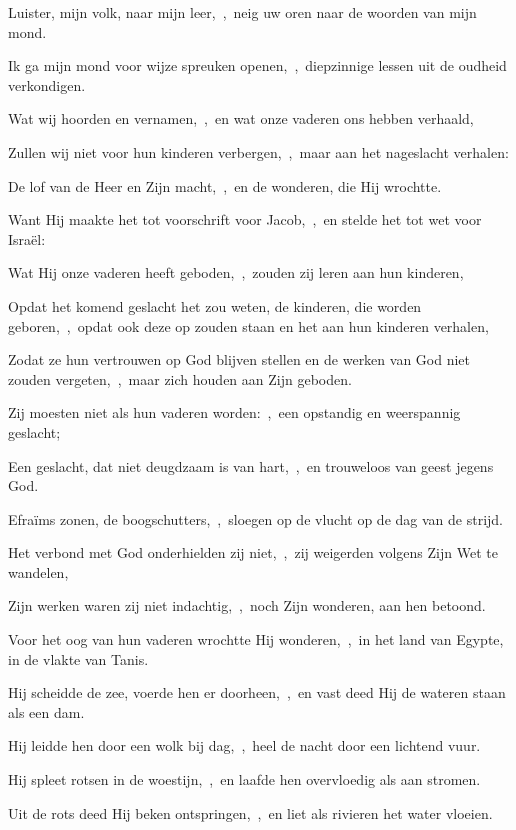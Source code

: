\documentclass[12pt,twoside,a5paper]{article}
\begin{document}



\begin{halfparskip}
  Luister, mijn volk, naar mijn leer,~\sep\ neig uw oren naar de woorden van mijn mond.


  Ik ga mijn mond voor wijze spreuken openen,~\sep\ diepzinnige lessen uit de oudheid verkondigen.

  Wat wij hoorden en vernamen,~\sep\ en wat onze vaderen ons hebben verhaald,

  Zullen wij niet voor hun kinderen verbergen,~\sep\ maar aan het nageslacht verhalen:

  De lof van de Heer en Zijn macht,~\sep\ en de wonderen, die Hij wrochtte.

  Want Hij maakte het tot voorschrift voor Jacob,~\sep\ en stelde het tot wet voor Israël:

  Wat Hij onze vaderen heeft geboden,~\sep\ zouden zij leren aan hun kinderen,

  Opdat het komend geslacht het zou weten, de kinderen, die worden geboren,~\sep\ opdat ook deze op zouden staan en het aan hun kinderen verhalen,

  Zodat ze hun vertrouwen op God blijven stellen en de werken van God niet zouden vergeten,~\sep\ maar zich houden aan Zijn geboden.

  Zij moesten niet als hun vaderen worden:~\sep\ een opstandig en weerspannig geslacht;

  Een geslacht, dat niet deugdzaam is van hart,~\sep\ en trouweloos van geest jegens God.
\end{halfparskip}


\begin{halfparskip}
  Efraïms zonen, de boogschutters,~\sep\ sloegen op de vlucht op de dag van de strijd.

  Het verbond met God onderhielden zij niet,~\sep\ zij weigerden volgens Zijn Wet te wandelen,

  Zijn werken waren zij niet indachtig,~\sep\ noch Zijn wonderen, aan hen betoond.

  Voor het oog van hun vaderen wrochtte Hij wonderen,~\sep\ in het land van Egypte, in de vlakte van Tanis.

  Hij scheidde de zee, voerde hen er doorheen,~\sep\ en vast deed Hij de wateren staan als een dam.

  Hij leidde hen door een wolk bij dag,~\sep\ heel de nacht door een lichtend vuur.

  Hij spleet rotsen in de woestijn,~\sep\ en laafde hen overvloedig als aan stromen.

  Uit de rots deed Hij beken ontspringen,~\sep\ en liet als rivieren het water vloeien.
\end{halfparskip}
\end{document}
